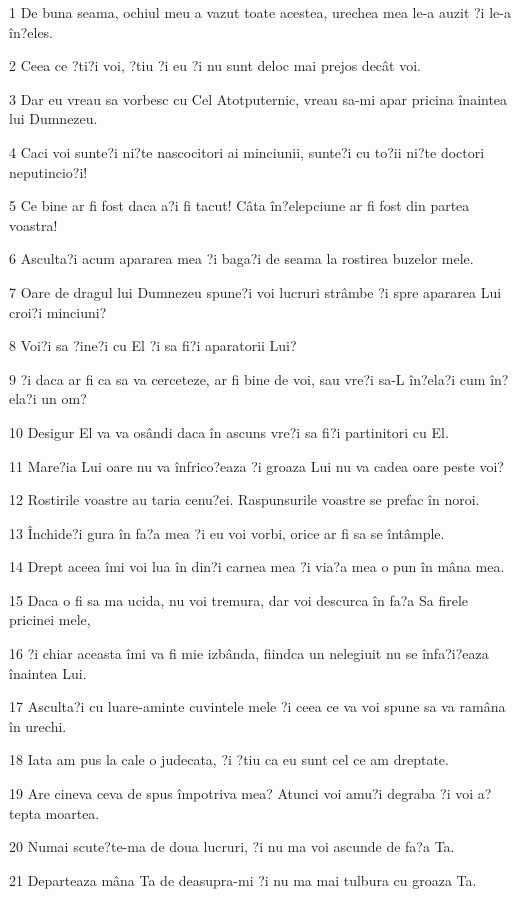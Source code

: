 \par 1 De buna seama, ochiul meu a vazut toate acestea, urechea mea le-a auzit ?i le-a în?eles.
\par 2 Ceea ce ?ti?i voi, ?tiu ?i eu ?i nu sunt deloc mai prejos decât voi.
\par 3 Dar eu vreau sa vorbesc cu Cel Atotputernic, vreau sa-mi apar pricina înaintea lui Dumnezeu.
\par 4 Caci voi sunte?i ni?te nascocitori ai minciunii, sunte?i cu to?ii ni?te doctori neputincio?i!
\par 5 Ce bine ar fi fost daca a?i fi tacut! Câta în?elepciune ar fi fost din partea voastra!
\par 6 Asculta?i acum apararea mea ?i baga?i de seama la rostirea buzelor mele.
\par 7 Oare de dragul lui Dumnezeu spune?i voi lucruri strâmbe ?i spre apararea Lui croi?i minciuni?
\par 8 Voi?i sa ?ine?i cu El ?i sa fi?i aparatorii Lui?
\par 9 ?i daca ar fi ca sa va cerceteze, ar fi bine de voi, sau vre?i sa-L în?ela?i cum în?ela?i un om?
\par 10 Desigur El va va osândi daca în ascuns vre?i sa fi?i partinitori cu El.
\par 11 Mare?ia Lui oare nu va înfrico?eaza ?i groaza Lui nu va cadea oare peste voi?
\par 12 Rostirile voastre au taria cenu?ei. Raspunsurile voastre se prefac în noroi.
\par 13 Închide?i gura în fa?a mea ?i eu voi vorbi, orice ar fi sa se întâmple.
\par 14 Drept aceea îmi voi lua în din?i carnea mea ?i via?a mea o pun în mâna mea.
\par 15 Daca o fi sa ma ucida, nu voi tremura, dar voi descurca în fa?a Sa firele pricinei mele,
\par 16 ?i chiar aceasta îmi va fi mie izbânda, fiindca un nelegiuit nu se înfa?i?eaza înaintea Lui.
\par 17 Asculta?i cu luare-aminte cuvintele mele ?i ceea ce va voi spune sa va ramâna în urechi.
\par 18 Iata am pus la cale o judecata, ?i ?tiu ca eu sunt cel ce am dreptate.
\par 19 Are cineva ceva de spus împotriva mea? Atunci voi amu?i degraba ?i voi a?tepta moartea.
\par 20 Numai scute?te-ma de doua lucruri, ?i nu ma voi ascunde de fa?a Ta.
\par 21 Departeaza mâna Ta de deasupra-mi ?i nu ma mai tulbura cu groaza Ta.
